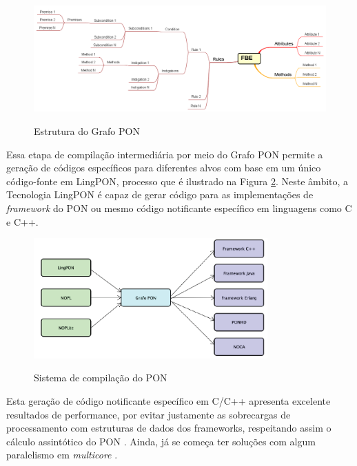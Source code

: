 \begin{figure}[!htb]
  \centering
  \caption{Estrutura do Grafo PON}
  \includegraphics[width=\textwidth]{../figures/grafo_pon_negrini.png}
  \smallskip
  \label{fig:grafo_pon}
\end{figure}

Essa etapa de compilação intermediária por meio do Grafo PON permite  a geração
de códigos específicos para diferentes alvos com base em um único código-fonte
em LingPON, processo que é ilustrado na Figura \ref{fig:sistema_compilacao}.
Neste âmbito, a Tecnologia LingPON é capaz de gerar código para as
implementações de \textit{framework} do PON ou mesmo código notificante
específico em linguagens como C e C++. 

\begin{figure}[!htb]
  \centering
  \caption{Sistema de compilação do PON}
  \includegraphics[width=0.8\textwidth]{../figures/sistema_compilacao.png}
  \smallskip
  \label{fig:sistema_compilacao}
\end{figure}

Esta geração de código notificante específico em C/C++ apresenta excelente
resultados de performance, por evitar justamente as sobrecargas de processamento
com estruturas de dados dos frameworks, respeitando assim o cálculo assintótico
do PON \cite{ronszcka_2017,doc_ronszcka_2019,oshiro_2021}. Ainda, já se começa
ter soluções com algum paralelismo em \textit{multicore}
\cite{doc_ronszcka_2019,martini_2021}.

